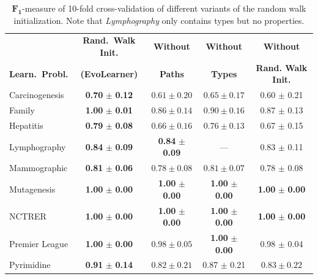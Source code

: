 \begin{table}[tb]
    \centering
	\caption{$\boldsymbol{F_1}$-measure of 10-fold cross-validation of different variants of the random walk initialization. Note that \textit{Lymphography} only contains types but no properties.}%
	\label{tab:random_walk_init_comparison}
	\setlength{\tabcolsep}{4pt}
	\renewcommand{\arraystretch}{1.08}
	\footnotesize
	\begin{tabular}{@{}l@{\hskip -4pt}ccc|c@{}}
			\toprule
			& \textbf{Rand.\ Walk Init.} & \textbf{Without} & \textbf{Without} & \textbf{Without} \\
			
			\textbf{Learn.\ Probl.} & \textbf{(EvoLearner)} & \textbf{Paths} & \textbf{Types} & \textbf{Rand. Walk Init.} \\
			
			\midrule
			
			Carcinogenesis & \textbf{0.70} $\boldsymbol{\pm}$ \textbf{0.12} & $0.61 \pm 0.20$ & $0.65 \pm 0.17$ & 0.60 $\pm$ 0.21 \\
			
			Family & \textbf{1.00} $\boldsymbol{\pm}$ \textbf{0.01} & $0.86 \pm 0.14$ & $0.90 \pm 0.16$  & 0.87 $\pm$ 0.13 \\
			
			Hepatitis & \textbf{0.79} $\boldsymbol{\pm}$ \textbf{0.08} & $0.66 \pm 0.16$ & $0.76 \pm 0.13$  & 0.67 $\pm$ 0.15 \\
			
			Lymphography & \textbf{0.84} $\boldsymbol{\pm}$ \textbf{0.09} & \textbf{0.84} $\boldsymbol{\pm}$ \textbf{0.09} & --- & 0.83 $\pm$ 0.11 \\
			
			Mammographic & \textbf{0.81} $\boldsymbol{\pm}$ \textbf{0.06} & $0.78 \pm 0.08$ & $0.81 \pm 0.07$  & 0.78 $\pm$ 0.08 \\
			 
			Mutagenesis & \textbf{1.00} $\boldsymbol{\pm}$ \textbf{0.00} & \textbf{1.00} $\boldsymbol{\pm}$ \textbf{0.00} & \textbf{1.00} $\boldsymbol{\pm}$ \textbf{0.00} & \textbf{1.00} $\boldsymbol{\pm}$ \textbf{0.00} \\
			
			NCTRER & \textbf{1.00} $\boldsymbol{\pm}$ \textbf{0.00} & \textbf{1.00} $\boldsymbol{\pm}$ \textbf{0.00} & \textbf{1.00} $\boldsymbol{\pm}$ \textbf{0.00} & \textbf{1.00} $\boldsymbol{\pm}$ \textbf{0.00} \\
			
			Premier League & \textbf{1.00} $\boldsymbol{\pm}$ \textbf{0.00} & $0.98 \pm 0.05$ & \textbf{1.00} $\boldsymbol{\pm}$ \textbf{0.00} & 0.98 $\pm$ 0.04 \\
			
			Pyrimidine & \textbf{0.91} $\boldsymbol{\pm}$ \textbf{0.14} & $0.82 \pm 0.21$ & 0.87 $\pm$ 0.21 & $0.83 \pm 0.22$ \\
			
			\bottomrule
	\end{tabular}
\end{table}
